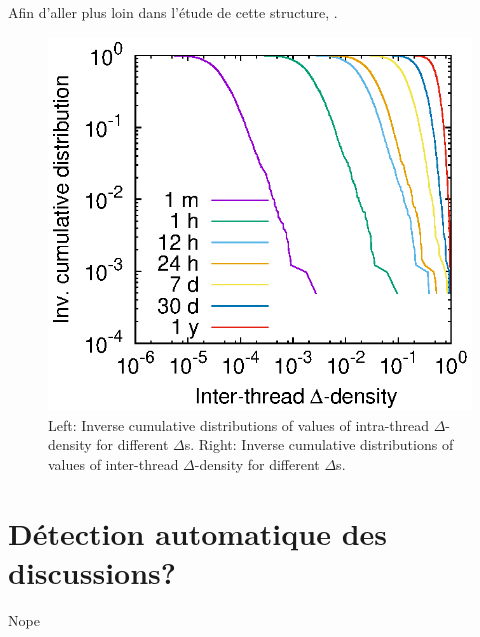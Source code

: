 Afin d'aller plus loin dans l'étude de cette structure, .


\begin{figure}
\centering
	\includegraphics[width=0.48\linewidth]{img/mailing/inter_delta.eps}
\caption{Left: Inverse cumulative distributions of values of intra-thread $\Delta$-density for different $\Delta$s. Right: Inverse cumulative distributions of values of inter-thread $\Delta$-density for different $\Delta$s.}
\label{fig:inter_dens_discussion}
\end{figure}

\section{Détection automatique des discussions?}

Nope